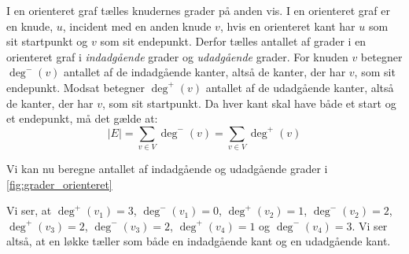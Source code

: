 I en orienteret graf tælles knudernes grader på anden vis. I en orienteret graf er en knude, $u$, incident med en anden knude $v$, hvis en orienteret kant har $u$ som sit startpunkt og $v$ som sit endepunkt. Derfor tælles antallet af grader i en orienteret graf i \emph{indadgående} grader og \emph{udadgående} grader. 
For knuden $v$ betegner $\deg^{-}(v)$ antallet af de indadgående kanter, altså de kanter, der har $v$, som sit endepunkt. Modsat betegner $\deg^{+}(v)$ antallet af de udadgående kanter, altså de kanter, der har $v$, som sit startpunkt. Da hver kant skal have både et start og et endepunkt, må det gælde at:
\begin{equation}
|E|=\sum_{v \in V} { } \deg^{-}(v) = \sum_{v \in V} { } \deg^{+}(v)
\end{equation}

\begin{exmp} \label{ex:grader_orienteret}
Vi kan nu beregne antallet af indadgående og udadgående grader i \autoref{fig:grader_orienteret}

Vi ser, at $\deg^{+}(v_{1})=3$, $\deg^{-}(v_{1})=0$, $\deg^{+}(v_{2})=1$, $\deg^{-}(v_{2})=2$, $\deg^{+}(v_{3})=2$, $\deg^{-}(v_{3})=2$, $\deg^{+}(v_{4})=1$ og $\deg^{-}(v_{4})=3$. Vi ser altså, at en løkke tæller som både en indadgående kant og en udadgående kant.
\end{exmp}